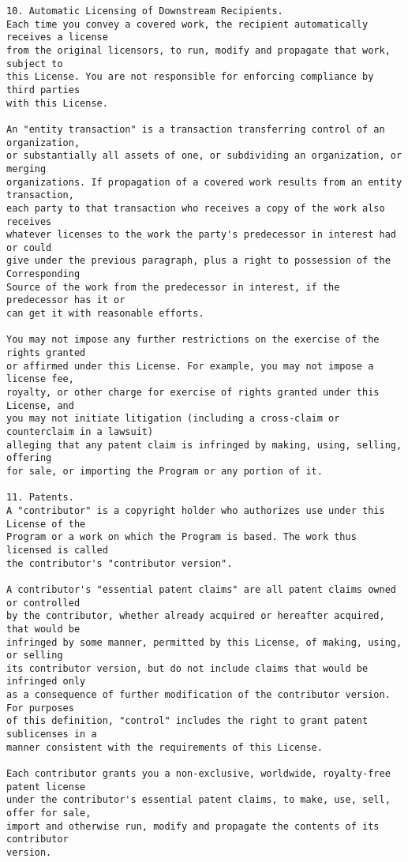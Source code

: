 \begin{verbatim}
10. Automatic Licensing of Downstream Recipients.
Each time you convey a covered work, the recipient automatically receives a license
from the original licensors, to run, modify and propagate that work, subject to
this License. You are not responsible for enforcing compliance by third parties
with this License.

An "entity transaction" is a transaction transferring control of an organization,
or substantially all assets of one, or subdividing an organization, or merging
organizations. If propagation of a covered work results from an entity transaction,
each party to that transaction who receives a copy of the work also receives
whatever licenses to the work the party's predecessor in interest had or could
give under the previous paragraph, plus a right to possession of the Corresponding
Source of the work from the predecessor in interest, if the predecessor has it or
can get it with reasonable efforts.

You may not impose any further restrictions on the exercise of the rights granted
or affirmed under this License. For example, you may not impose a license fee,
royalty, or other charge for exercise of rights granted under this License, and
you may not initiate litigation (including a cross-claim or counterclaim in a lawsuit)
alleging that any patent claim is infringed by making, using, selling, offering
for sale, or importing the Program or any portion of it.

11. Patents.
A "contributor" is a copyright holder who authorizes use under this License of the
Program or a work on which the Program is based. The work thus licensed is called
the contributor's "contributor version".

A contributor's "essential patent claims" are all patent claims owned or controlled
by the contributor, whether already acquired or hereafter acquired, that would be
infringed by some manner, permitted by this License, of making, using, or selling
its contributor version, but do not include claims that would be infringed only
as a consequence of further modification of the contributor version. For purposes
of this definition, "control" includes the right to grant patent sublicenses in a
manner consistent with the requirements of this License.

Each contributor grants you a non-exclusive, worldwide, royalty-free patent license
under the contributor's essential patent claims, to make, use, sell, offer for sale,
import and otherwise run, modify and propagate the contents of its contributor
version.


\end{verbatim}
